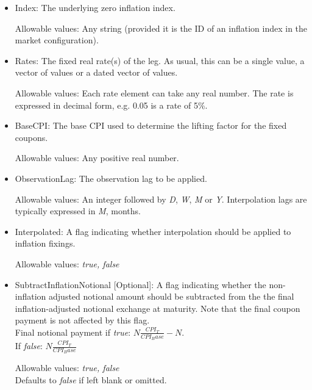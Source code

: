 \begin{itemize}
\item Index: The underlying zero inflation index.

Allowable values:  Any string (provided it is the ID of an inflation index in the market configuration).
\item Rates: The fixed real rate(s) of the leg. As usual, this can be a single value, a vector of values or a dated vector of
  values.
 
 Allowable values: Each rate element can take any  real number. The rate is
  expressed in decimal form, e.g. 0.05 is a rate of 5\%.
\item BaseCPI: The base CPI used to determine the lifting factor for the fixed coupons.

Allowable values:  Any positive real number.
\item ObservationLag: The observation lag to be applied.

Allowable values: An integer followed by \emph{D}, \emph{W}, \emph{M} or \emph{Y}. Interpolation lags are typically expressed in \emph{M}, months.
\item Interpolated: A flag indicating whether interpolation should be applied to inflation fixings. 

Allowable values:  \emph{true, false} 
\item SubtractInflationNotional [Optional]: A flag indicating whether the non-inflation adjusted notional amount should be subtracted from the the final inflation-adjusted notional exchange at maturity.  Note that the final coupon payment is not affected by this flag. \\ Final notional payment if \emph{true}: $N \frac{CPI_T}{CPI_Base}-N$. \\ If  \emph{false}: $N \frac{CPI_T}{CPI_Base}$ 

Allowable values:  \emph{true, false} 
\\Defaults to \emph{false}  if left blank or omitted.
\end{itemize} 

